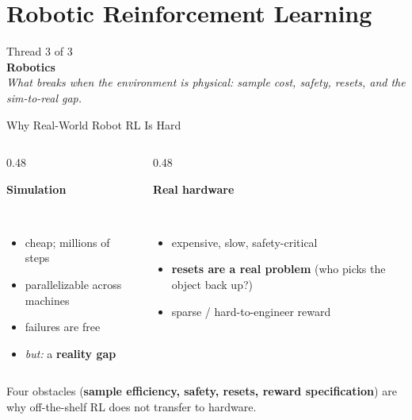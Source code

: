 \section{Robotic Reinforcement Learning}

\begin{frame}{}
\vfill
\centering
{\large Thread 3 of 3}\\[0.5em]
{\LARGE \textbf{Robotics}}\\[0.8em]
{\footnotesize\itshape What breaks when the environment is \emph{physical}: sample cost, safety, resets, and the sim-to-real gap.}
\vfill
\end{frame}

\begin{frame}{Why Real-World Robot RL Is Hard}
\begin{columns}[T]
\begin{column}{0.48\textwidth}
\centering
\setlength{\fboxsep}{6pt}%
\colorbox{boxgreen!50}{\parbox{0.9\linewidth}{\centering\textbf{Simulation}}}\\[0.5em]
\footnotesize
\begin{itemize}\itemsep0.2em
    \item cheap; millions of steps
    \item parallelizable across machines
    \item failures are free
    \item \emph{but:} a \textbf{reality gap}
\end{itemize}
\end{column}
\begin{column}{0.48\textwidth}
\centering
\setlength{\fboxsep}{6pt}%
\colorbox{boxred!40}{\parbox{0.9\linewidth}{\centering\textbf{Real hardware}}}\\[0.5em]
\footnotesize
\begin{itemize}\itemsep0.2em
    \item expensive, slow, safety-critical
    \item \textbf{resets are a real problem} \scriptsize(who picks the object back up?)
    \item sparse / hard-to-engineer reward
\end{itemize}
\end{column}
\end{columns}
\vfill
\begin{center}
\setlength{\fboxsep}{6pt}%
\colorbox{boxblue!50}{\parbox{0.9\textwidth}{\centering\footnotesize
Four obstacles (\textbf{sample efficiency, safety, resets, reward
specification}) are why off-the-shelf RL does not transfer to hardware.}}
\end{center}
\end{frame}

